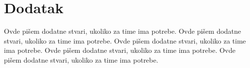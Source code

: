 \documentclass[a4paper]{article}
\begin{document}
\appendix
\section{Dodatak}
Ovde pišem dodatne stvari, ukoliko za time ima potrebe.
Ovde pišem dodatne stvari, ukoliko za time ima potrebe.
Ovde pišem dodatne stvari, ukoliko za time ima potrebe.
Ovde pišem dodatne stvari, ukoliko za time ima potrebe.
Ovde pišem dodatne stvari, ukoliko za time ima potrebe.
\end{document}
